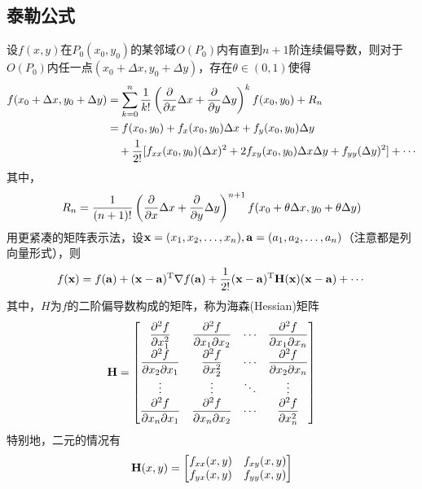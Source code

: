 \subsection{泰勒公式}
\begin{theorem}[Taylor]
设$f(x,y)$在$P_0(x_0,y_0)$的某邻域$O(P_0)$内有直到$n+1$阶连续偏导数，则对于$O(P_0)$内任一点$(x_0+\Delta x,y_0+\Delta y)$，存在$\theta\in(0,1)$使得
\[\begin{aligned}
f(x_0+\Delta x,y_0+\Delta y)&=\sum_{k=0}^n\frac{1}{k!}\left(\dfrac{\partial }{\partial x}\Delta x+\dfrac{\partial }{\partial y}\Delta y\right)^kf(x_0,y_0)+R_n\\
&=f(x_0,y_0)+f_x(x_0,y_0)\Delta x+f_y(x_0,y_0)\Delta y\\
&\quad+\frac{1}{2!}[f_{xx}(x_0,y_0)(\Delta x)^2+2f_{xy}(x_0,y_0)\Delta x\Delta y+f_{yy}(\Delta y)^2]+\cdots
\end{aligned}\]
其中，
\[R_n=\frac{1}{(n+1)!}\left(\dfrac{\partial }{\partial x}\Delta x+\dfrac{\partial }{\partial y}\Delta y\right)^{n+1}f(x_0+\theta\Delta x,y_0+\theta\Delta y)\]
用更紧凑的矩阵表示法，设$\mathbf{x}=(x_1,x_2,\ldots,x_n),\mathbf{a}=(a_1,a_2,\ldots,a_n)$（注意都是列向量形式），则
\[f(\mathbf{x})=f(\mathbf{a})+(\mathbf{x}-\mathbf{a})^{\mathrm{T}}\nabla f(\mathbf{a})+\frac{1}{2!}(\mathbf{x}-\mathbf{a})^{\mathrm{T}} \mathbf{H}(\mathbf{x})(\mathbf{x}-\mathbf{a})+\cdots\]
其中，$H$为$f$的二阶偏导数构成的矩阵，称为海森(Hessian)矩阵
\[\mathbf{H}=\begin{bmatrix}\dfrac{\partial^2 f}{\partial x_1^2} & \dfrac{\partial^2 f}{\partial x_1\partial x_2} &\cdots &\dfrac{\partial^2 f}{\partial x_1\partial x_n}\\
\dfrac{\partial^2 f}{\partial x_2\partial x_1}&\dfrac{\partial^2 f}{\partial x_2^2}&\cdots&\dfrac{\partial^2 f}{\partial x_2\partial x_n}\\
\vdots&\vdots&\ddots&\vdots\\
\dfrac{\partial^2 f}{\partial x_n\partial x_1}&\dfrac{\partial^2 f}{\partial x_n\partial x_2}&\cdots&\dfrac{\partial^2 f}{\partial x_n^2}\end{bmatrix}\]
特别地，二元的情况有
\[\mathbf{H}(x,y)=\begin{bmatrix}f_{xx}(x,y) & f_{xy}(x,y)\\f_{yx}(x,y) & f_{yy}(x,y)\end{bmatrix}\]
\end{theorem}

